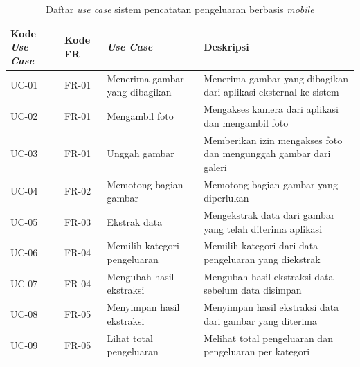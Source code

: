 \begin{table}[h!]
\centering
\caption{Daftar \emph{use case} sistem pencatatan pengeluaran berbasis \emph{mobile}}
\label{tab:use-case-list}
\begin{tabularx}{\textwidth}{|p{1.6cm}|p{1.5cm}|p{2.8cm}|X|}
\hline
\textbf{Kode \emph{Use Case}} & \textbf{Kode FR} & \textbf{\emph{Use Case}} & \textbf{Deskripsi} \\ \hline
UC-01 & FR-01 & Menerima gambar yang dibagikan & Menerima gambar yang dibagikan dari aplikasi eksternal ke sistem \\ \hline
UC-02 & FR-01 & Mengambil foto & Mengakses kamera dari aplikasi dan mengambil foto \\ \hline
UC-03 & FR-01 & Unggah gambar & Memberikan izin mengakses foto dan mengunggah gambar dari galeri \\ \hline
UC-04 & FR-02 & Memotong bagian gambar & Memotong bagian gambar yang diperlukan \\ \hline
UC-05 & FR-03 & Ekstrak data & Mengekstrak data dari gambar yang telah diterima aplikasi \\ \hline
UC-06 & FR-04 & Memilih kategori pengeluaran & Memilih kategori dari data pengeluaran yang diekstrak \\ \hline
UC-07 & FR-04 & Mengubah hasil ekstraksi & Mengubah hasil ekstraksi data sebelum data disimpan \\ \hline
UC-08 & FR-05 & Menyimpan hasil ekstraksi & Menyimpan hasil ekstraksi data dari gambar yang diterima \\ \hline
UC-09 & FR-05 & Lihat total pengeluaran & Melihat total pengeluaran dan pengeluaran per kategori \\ \hline
\end{tabularx}
\end{table}

\newpage
